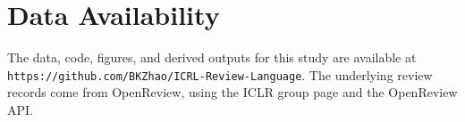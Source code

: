 \documentclass[9pt,twocolumn]{pnas-new}
\begin{document}
\showmatmethods

\section*{Data Availability}

The data, code, figures, and derived outputs for this study are available at \texttt{https://github.com/BKZhao/ICRL-Review-Language}. The underlying review records come from OpenReview, using the ICLR group page and the OpenReview API.




\end{document}
